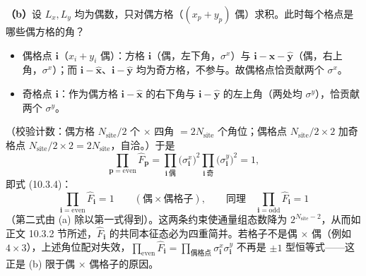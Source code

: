 \textbf{（b）}设 $L_x,L_y$ 均为偶数，只对偶方格（$(x_p+y_p)$ 偶）求积。此时每个格点是哪些偶方格的角？
\begin{itemize}
\item 偶格点 $\pmb i$（$x_i+y_i$ 偶）：方格 $\pmb i$（偶，左下角，$\sigma^{x}$）与 $\pmb i-\hat{\pmb x}-\hat{\pmb y}$（偶，右上角，$\sigma^{x}$）；而 $\pmb i-\hat{\pmb x}$、$\pmb i-\hat{\pmb y}$ 均为奇方格，不参与。故偶格点恰贡献两个 $\sigma^{x}$。
\item 奇格点 $\pmb i$：作为偶方格 $\pmb i-\hat{\pmb x}$ 的右下角与 $\pmb i-\hat{\pmb y}$ 的左上角（两处均 $\sigma^{y}$），恰贡献两个 $\sigma^{y}$。
\end{itemize}
（校验计数：偶方格 $N_{\text{site}}/2$ 个 $\times$ 四角 $=2N_{\text{site}}$ 个角位；偶格点 $N_{\text{site}}/2\times2$ 加奇格点 $N_{\text{site}}/2\times2=2N_{\text{site}}$，自洽。）于是
\begin{equation*}
\prod_{\pmb p=\mathrm{even}}\hat F_{\pmb p}=\prod_{\pmb i\ \text{偶}}\big(\sigma_{\pmb i}^{x}\big)^{2}\prod_{\pmb i\ \text{奇}}\big(\sigma_{\pmb i}^{y}\big)^{2}=1,
\end{equation*}
即式 (10.3.4)：
\begin{equation*}
\boxed{\;\prod_{\pmb i=\mathrm{even}}\hat F_{\pmb i}=1\qquad(\text{偶}\times\text{偶格子}),\qquad\text{同理}\quad\prod_{\pmb i=\mathrm{odd}}\hat F_{\pmb i}=1\;}
\end{equation*}
（第二式由 (a) 除以第一式得到）。这两条约束使通量组态数降为 $2^{N_{\text{site}}-2}$，从而如正文 10.3.2 节所述，$\hat F_{\pmb i}$ 的共同本征态必为四重简并。若格子不是偶 $\times$ 偶（例如 $4\times3$），上述角位配对失效，$\prod_{\mathrm{even}}\hat F_{\pmb i}=\prod_{\text{偶格点}}\sigma_{\pmb i}^{x}\sigma_{\pmb i}^{y}$ 不再是 $\pm1$ 型恒等式——这正是 (b) 限于偶 $\times$ 偶格子的原因。

